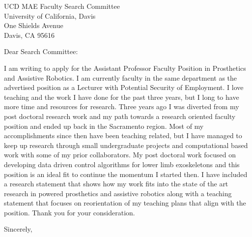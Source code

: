 \documentclass{letter}
\begin{document}
\begin{letter}{
    UCD MAE Faculty Search Committee \\
    University of California, Davis \\
    One Shields Avenue \\
  Davis, CA 95616}
\opening{Dear Search Committee:}

I am writing to apply for the Assistant Professor Faculty Position in
Prosthetics and Assistive Robotics. I am currently faculty in the same
department as the advertised position as a Lecturer with Potential Security of
Employment. I love teaching and the work I have done for the past three years,
but I long to have more time and resources for research. Three years ago I was
diverted from my post doctoral research work and my path towards a research
oriented faculty position and ended up back in the Sacramento region. Most of
my accomplishments since then have been teaching related, but I have managed to
keep up research through small undergraduate projects and computational based
work with some of my prior collaborators. My post doctoral work focused on
developing data driven control algorithms for lower limb exoskeletons and this
position is an ideal fit to continue the momentum I started then. I have
included a research statement that shows how my work fits into the state of the
art research in powered prosthetics and assistive robotics along with a
teaching statement that focuses on reorientation of my teaching plans that
align with the position. Thank you for your consideration.

\closing{Sincerely,}

\end{letter}
\end{document}
